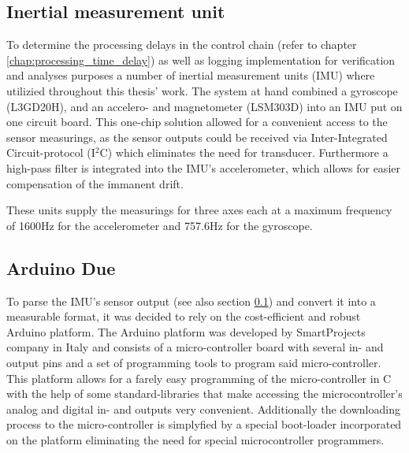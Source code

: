 \documentclass[ExampleMasters.tex]{subfiles}
\begin{document}
\subsection{Inertial measurement unit}
\label{sec:IMU}
To determine the processing delays in the control chain (refer to chapter \ref{chap:processing_time_delay}) as well as logging implementation for verification and analyses purposes a number of inertial measurement units (IMU) where utilizied throughout this thesis' work. The system at hand combined a gyroscope (L3GD20H), and an accelero- and magnetometer (LSM303D) into an IMU put on one circuit board.\cite{IMU_homepage_shop} This one-chip solution allowed for a convenient access to the sensor measurings, as the sensor outputs could be received via Inter-Integrated Circuit-protocol (I$^{2}$C)  which eliminates the need for transducer. Furthermore a high-pass filter is integrated into the IMU's accelerometer, which allows for easier compensation of the immanent drift. 

These units supply the measurings for three axes each at a maximum frequency of 1600Hz for the accelerometer and 757.6Hz for the gyroscope. \cite{accelerometer_datasheet}\cite{gyrometer_datasheet}


\subsection{Arduino Due}
\label{sec:arduino}

To parse the IMU's sensor output (see also section \ref{sec:IMU}) and convert it into a measurable format, it was decided to rely on the cost-efficient and robust Arduino platform. The Arduino platform was developed by  SmartProjects company in Italy and consists of a micro-controller board with several in- and output pins and a set of programming tools to program said micro-controller. This platform allows for a farely easy programming of the micro-controller in C with the help of some standard-libraries that make accessing the microcontroller's analog and digital in- and outputs very convenient. Additionally the downloading process to the micro-controller is simplyfied by a special boot-loader incorporated on the platform eliminating the need for special microcontroller programmers. 
\end{document}
